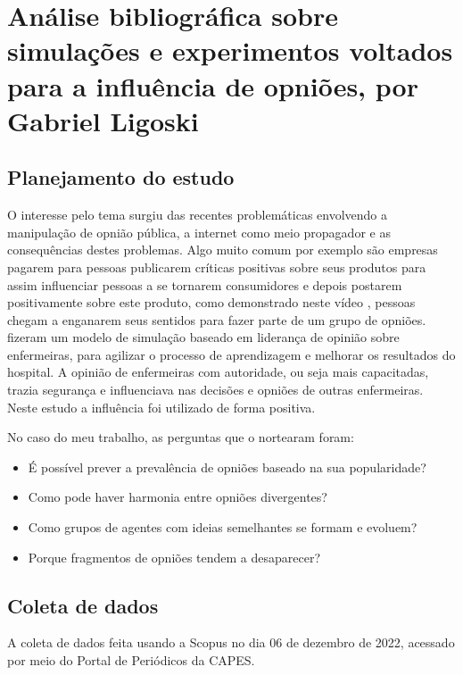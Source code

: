 
\chapter{Análise bibliográfica sobre simulações e experimentos voltados para a influência de opniões, por Gabriel Ligoski\label{chap:bibliometria:gabrielligoski}}

\section{Planejamento do estudo}
O interesse pelo tema surgiu das recentes problemáticas envolvendo a manipulação de opnião pública, a internet como meio propagador e as consequências destes problemas.
Algo muito comum por exemplo são empresas pagarem para pessoas publicarem críticas positivas sobre seus produtos para assim influenciar pessoas a se tornarem consumidores e depois postarem positivamente sobre este produto, como demonstrado neste vídeo \cite{linus_tech_tips_its_2022}, pessoas chegam a enganarem seus sentidos para fazer parte de um grupo de opniões.
\cite{anderson_development_2014} fizeram um modelo de simulação baseado em liderança de opinião sobre enfermeiras, para agilizar o processo de aprendizagem e melhorar os resultados do hospital. A opinião de enfermeiras com autoridade, ou seja mais capacitadas, trazia segurança e influenciava nas decisões e opniões de outras enfermeiras. Neste estudo a influência foi utilizado de forma positiva.

No caso do meu trabalho, as perguntas que o nortearam foram:
\begin{itemize}
    \item É possível prever a prevalência de opniões baseado na sua popularidade?
    \item Como pode haver harmonia entre opniões divergentes?
    \item Como grupos de agentes com ideias semelhantes se formam e evoluem?
    \item Porque fragmentos de opniões tendem a desaparecer?
\end{itemize}

\section{Coleta de dados}
A coleta de dados feita usando a Scopus no dia 06 de dezembro de 2022, acessado por meio do
Portal de Periódicos da CAPES.

